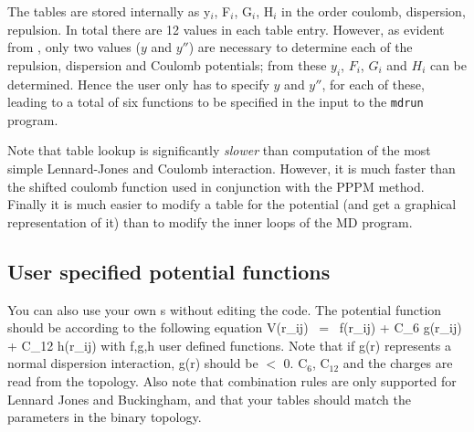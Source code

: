 The tables are stored internally as y$_i$, F$_i$, G$_i$, H$_i$ in the order
coulomb, dispersion, repulsion.
In total there are 12 values in each table entry. However, as evident from 
, only two values ($y$ and $y''$) are necessary to determine each of the repulsion,
dispersion and Coulomb potentials; from these $y_i$, $F_i$, $G_i$ and
$H_i$ can be determined.  Hence the {\gromacs} user only has to
specify $y$ and $y''$, for each of these, leading to a total of six
functions to be specified in the input to the {\tt mdrun} program.

Note that table lookup is significantly {\em
slower} than computation of the most simple Lennard-Jones and Coulomb
interaction. However, it is much faster than the shifted coulomb
function used in conjunction with the PPPM method. Finally it is much
easier to modify a table for the potential (and get a graphical
representation of it) than to modify the inner loops of the MD
program.

\subsection{User specified potential functions}
You can also use your own s 
without editing the {\gromacs} code. 
The potential function should be according to the following equation
\beq
V(r_{ij}) ~=~  f(r_{ij}) + C_6 g(r_{ij}) + C_{12} h(r_{ij})
\eeq
with f,g,h user defined functions. Note that if g(r) represents a
normal dispersion interaction, g(r) should be $<$ 0. C$_6$, C$_{12}$
and the charges are read from the topology. Also note that combination
rules are only supported for Lennard Jones and Buckingham, and that
your tables should match the parameters in the binary topology.

